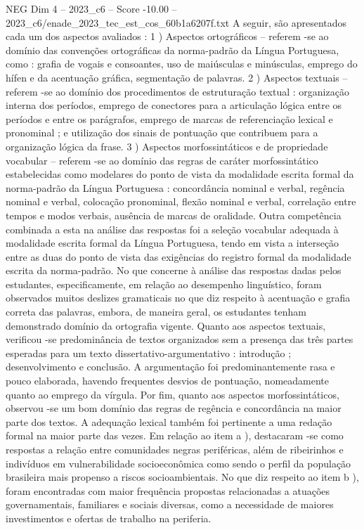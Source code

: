 \begin{textsample}{NEG Dim 4 – 2023\_c6 – Score -10.00 – 2023\_c6/enade\_2023\_tec\_est\_cos\_60b1a6207f.txt}
A seguir, são apresentados cada um dos aspectos avaliados : 1 ) Aspectos ortográficos – referem -se ao domínio das convenções ortográficas da norma-padrão da Língua Portuguesa, como : grafia de vogais e consoantes, uso de maiúsculas e minúsculas, emprego do hífen e da acentuação gráfica, segmentação de palavras. 2 ) Aspectos textuais – referem -se ao domínio dos procedimentos de estruturação textual : organização interna dos períodos, emprego de conectores para a articulação lógica entre os períodos e entre os parágrafos, emprego de marcas de referenciação lexical e pronominal ; e utilização dos sinais de pontuação que contribuem para a organização lógica da frase. 3 ) Aspectos morfossintáticos e de propriedade vocabular – referem -se ao domínio das regras de caráter morfossintático estabelecidas como modelares do ponto de vista da modalidade escrita formal da norma-padrão da Língua Portuguesa : concordância nominal e verbal, regência nominal e verbal, colocação pronominal, flexão nominal e verbal, correlação entre tempos e modos verbais, ausência de marcas de oralidade.
Outra competência combinada a esta na análise das respostas foi a seleção vocabular adequada à modalidade escrita formal da Língua Portuguesa, tendo em vista a interseção entre as duas do ponto de vista das exigências do registro formal da modalidade escrita da norma-padrão.
No que concerne à análise das respostas dadas pelos estudantes, especificamente, em relação ao desempenho linguístico, foram observados muitos deslizes gramaticais no que diz respeito à acentuação e grafia correta das palavras, embora, de maneira geral, os estudantes tenham demonstrado domínio da ortografia vigente.
Quanto aos aspectos textuais, verificou -se predominância de textos organizados sem a presença das três partes esperadas para um texto dissertativo-argumentativo : introdução ; desenvolvimento e conclusão.
A argumentação foi predominantemente rasa e pouco elaborada, havendo frequentes desvios de pontuação, nomeadamente quanto ao emprego da vírgula.
Por fim, quanto aos aspectos morfossintáticos, observou -se um bom domínio das regras de regência e concordância na maior parte dos textos.
A adequação lexical também foi pertinente a uma redação formal na maior parte das vezes.
Em relação ao item a ), destacaram -se como respostas a relação entre comunidades negras periféricas, além de ribeirinhos e indivíduos em vulnerabilidade socioeconômica como sendo o perfil da população brasileira mais propenso a riscos socioambientais.
No que diz respeito ao item b ), foram encontradas com maior frequência propostas relacionadas a atuações governamentais, familiares e sociais diversas, como a necessidade de maiores investimentos e ofertas de trabalho na periferia.

\end{textsample}
